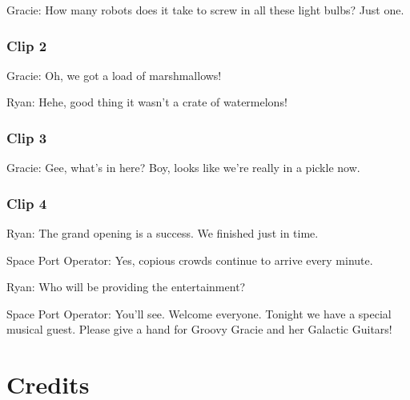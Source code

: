 Gracie: How many robots does it take to screw in all these light bulbs? Just one.

\subsubsection{Clip 2}

Gracie: Oh, we got a load of marshmallows!

Ryan: Hehe, good thing it wasn't a crate of watermelons!

\subsubsection{Clip 3}

Gracie: Gee, what's in here? Boy, looks like we're really in a pickle now.

\subsubsection{Clip 4}

Ryan: The grand opening is a success. We finished just in time.

Space Port Operator: Yes, copious crowds continue to arrive every minute.

Ryan: Who will be providing the entertainment?

Space Port Operator: You'll see. Welcome everyone. Tonight we have a special musical guest. Please give a hand for Groovy Gracie and her Galactic Guitars!

\section{Credits}

